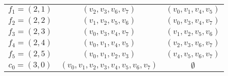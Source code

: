 \begin{center}
\begin{tabular}{ccc}
    $f_1 = (2, 1)$ & $(v_2, v_3, v_6, v_7)$ & $(v_0, v_1, v_4, v_5)$ \\
    $f_2 = (2, 2)$ & $(v_1, v_2, v_5, v_6)$ & $(v_0, v_3, v_4, v_7)$ \\
    $f_3 = (2, 3)$ & $(v_0, v_3, v_4, v_7)$ & $(v_1, v_2, v_5, v_6)$ \\
    $f_4 = (2, 4)$ & $(v_0, v_1, v_4, v_5)$ & $(v_2, v_3, v_6, v_7)$ \\
    $f_5 = (2, 5)$ & $(v_0, v_1, v_2, v_3)$ & $(v_4, v_5, v_6, v_7)$ \\
    $c_0 = (3, 0)$ & $(v_0, v_1, v_2, v_3, v_4, v_5, v_6, v_7)$ & $\emptyset$ \\
    \toprule
  \end{tabular}
\end{center}
